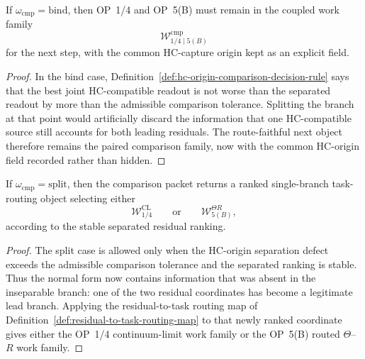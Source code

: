 \begin{proposition}
\label{prop:bind-branch-retains-common-hc-capture-origin}
If $\omega_{\mathrm{cmp}}=\mathrm{bind}$, then OP~1/4 and OP~5(B) must remain in the coupled work family
\[
 \mathcal W_{1/4\mid 5(B)}^{\mathrm{cmp}}
\]
for the next step, with the common HC-capture origin kept as an explicit field.
\end{proposition}

\begin{proof}
In the bind case, Definition~\ref{def:hc-origin-comparison-decision-rule} says that the best joint HC-compatible readout is not worse than the separated readout by more than the admissible comparison tolerance. Splitting the branch at that point would artificially discard the information that one HC-compatible source still accounts for both leading residuals. The route-faithful next object therefore remains the paired comparison family, now with the common HC-origin field recorded rather than hidden.
\end{proof}

\begin{proposition}
\label{prop:split-branch-returns-to-ranked-single-branch-work}
If $\omega_{\mathrm{cmp}}=\mathrm{split}$, then the comparison packet returns a ranked single-branch task-routing object selecting either
\[
 \mathcal W_{1/4}^{\mathrm{CL}}
 \qquad\text{or}\qquad
 \mathcal W_{5(B)}^{\Theta R},
\]
according to the stable separated residual ranking.
\end{proposition}

\begin{proof}
The split case is allowed only when the HC-origin separation defect exceeds the admissible comparison tolerance and the separated ranking is stable. Thus the normal form now contains information that was absent in the inseparable branch: one of the two residual coordinates has become a legitimate lead branch. Applying the residual-to-task routing map of Definition~\ref{def:residual-to-task-routing-map} to that newly ranked coordinate gives either the OP~1/4 continuum-limit work family or the OP~5(B) routed $\Theta$--$R$ work family.
\end{proof}


